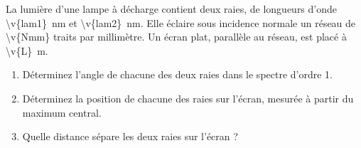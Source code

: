 La lumière d'une lampe à décharge contient deux raies, de longueurs d'onde \qty{\v{lam1}}{nm} et \qty{\v{lam2}}{nm}. Elle éclaire sous incidence normale un réseau de \num{\v{Nmm}} traits par millimètre. Un écran plat, parallèle au réseau, est placé à \qty{\v{L}}{m}.

\begin{enumerate}[label=\alph*)]
    \item Déterminez l'angle de chacune des deux raies dans le spectre d'ordre 1.
    \item Déterminez la position de chacune des raies sur l'écran, mesurée à partir du maximum central.
    \item Quelle distance sépare les deux raies sur l'écran ?
\end{enumerate}

